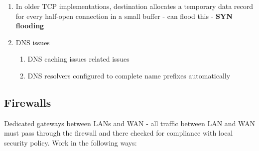 \documentclass{article}
\newenvironment{cons}{\par\color{red}}{\par}
\begin{document}
\begin{cons}
\begin{enumerate}
	\item In older TCP implementations, destination allocates a temporary data record for every half-open connection in a small buffer - can flood this - \textbf{SYN flooding}
	
	\item DNS issues
	\begin{enumerate}
		\item DNS caching issues related issues
		\item DNS resolvers configured to complete name prefixes automatically
	\end{enumerate}
\end{enumerate}

\end{cons}


\subsection{Firewalls}
Dedicated gateways between LANs and WAN - all traffic between LAN and WAN must pass through the firewall and there checked for compliance with local security policy. Work in the following ways:
\end{document}
